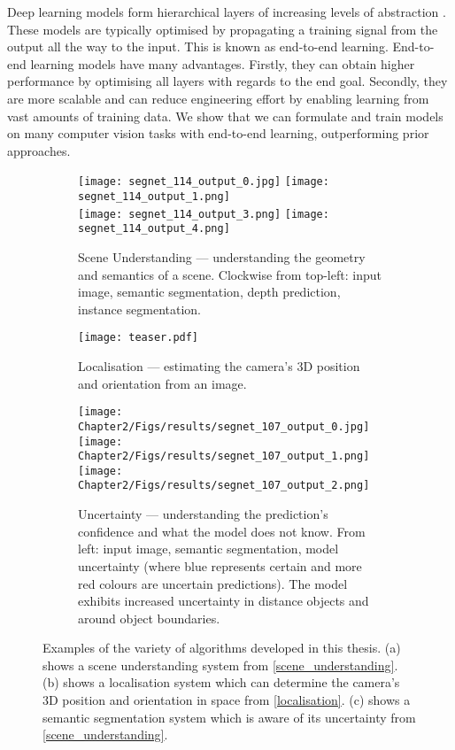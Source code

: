 Deep learning models form hierarchical layers of increasing levels of abstraction \citep{goodfellow2016deep}. These models are typically optimised by propagating a training signal from the output all the way to the input. This is known as end-to-end learning. 
End-to-end learning models have many advantages. Firstly, they can obtain higher performance by optimising all layers with regards to the end goal. Secondly, they are more scalable and can reduce engineering effort by enabling learning from vast amounts of training data. We show that we can formulate and train models on many computer vision tasks with end-to-end learning, outperforming prior approaches.

\begin{figure}[t]
\centering
    \begin{subfigure}[b]{0.65\textwidth}
\centering
        \texttt{[image: segnet\_114\_output\_0.jpg]}
        \texttt{[image: segnet\_114\_output\_1.png]} \\
        \texttt{[image: segnet\_114\_output\_3.png]}
        \texttt{[image: segnet\_114\_output\_4.png]}
        \caption{Scene Understanding --- understanding the geometry and semantics of a scene. Clockwise from top-left: input image, semantic segmentation, depth prediction, instance segmentation.}
    \end{subfigure}
    \quad
    \begin{subfigure}[b]{0.3\textwidth}
\centering
        \texttt{[image: teaser.pdf]}
        \caption{Localisation --- estimating the camera's 3D position and orientation from an image.}
    \end{subfigure}
    
    
    \begin{subfigure}[b]{\textwidth}
\centering
        \texttt{[image: Chapter2/Figs/results/segnet\_107\_output\_0.jpg]}
        \texttt{[image: Chapter2/Figs/results/segnet\_107\_output\_1.png]}
        \texttt{[image: Chapter2/Figs/results/segnet\_107\_output\_2.png]}
        \caption{Uncertainty --- understanding the prediction's confidence and what the model does not know. From left: input image, semantic segmentation, model uncertainty (where blue represents certain and more red colours are uncertain predictions). The model exhibits increased uncertainty in distance objects and around object boundaries.}
    \end{subfigure}
\caption[Examples of algorithms in this thesis.]{Examples of the variety of algorithms developed in this thesis. (a) shows a scene understanding system from \cref{scene_understanding}. (b) shows a localisation system which can determine the camera's 3D position and orientation in space from \cref{localisation}. (c) shows a semantic segmentation system which is aware of its uncertainty from \cref{scene_understanding}.}
\label{ch1:teaser}
\end{figure}

